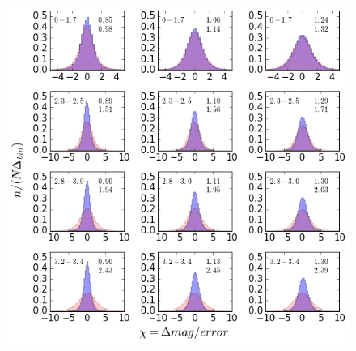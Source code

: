 \documentclass[fleqn,usenatbib]{mnras}  %
\begin{document}
\begin{figure}
\label{fig:3}
\includegraphics[width=1.15\columnwidth, center]{Fig_3_histogram_panels.png}

\end{figure}
\end{document}
